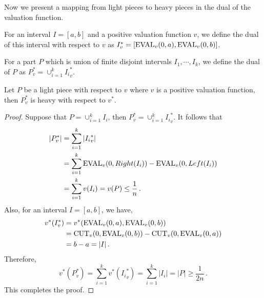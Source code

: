 Now we present a mapping from light pieces to heavy pieces in the dual of the valuation function.
\begin{definition}
For an interval $I=[a,b]$ and a positive valuation function $v$, we define the dual of this interval with respect to $v$ as $I_v^{*}=[\operatorname{EVAL}_v(0,a),\operatorname{EVAL}_v(0,b)]$.

For a part $P$ which is union of finite disjoint intervals $I_1,\cdots, I_k$, we define the dual of $P$ as $P_v^{*}= \cup_{i=1}^{k} {I_i}_v^{*}$.
\end{definition}
\begin{lemma}
\label{heavy}
Let $P$ be a light piece with respect to $v$ where $v$ is a positive valuation function, then $P_{v}^{*}$ is heavy with respect to $v^{*}$.
\end{lemma}
\begin{proof}
Suppose that $P= \cup_{i=1}^{k} I_i$, then $P_v^{*}= \cup_{i=1}^{k} {I_i}_v^{*}$. It follows that
\begin{align*}
|P_v^{*}|&=\sum_{i=1}^{k} |{I_i}_v^{*}|\\
&=\sum_{i=1}^{k} {\operatorname{EVAL}}_v(0,Right(I_i))- {\operatorname{EVAL}}_v(0,Left(I_i))\\&
 = \sum_{i=1}^{k} v(I_i) = v(P) \le \dfrac{1}{n} \,.
\end{align*}
Also, for an interval $I=[a,b]$, we have,
\begin{align*}
v^*(I_v^*) &= v^*(\operatorname{EVAL}_v(0,a),\operatorname{EVAL}_v(0,b)) \\
&= {\operatorname{CUT}}_v(0,\operatorname{EVAL}_v(0,b)) - {\operatorname{CUT}}_v(0,\operatorname{EVAL}_v(0,a)) 
\\&= b-a = |I| \,.
\end{align*}
Therefore,
$$
v^{*}(P_v^{*})=\sum_{i=1}^{k} v^{*}({I_i}_v^{*}) =  \sum_{i=1}^{k} |I_i| = |P| \ge \dfrac{1}{2n} \,.
$$
This completes the proof.
\end{proof}

